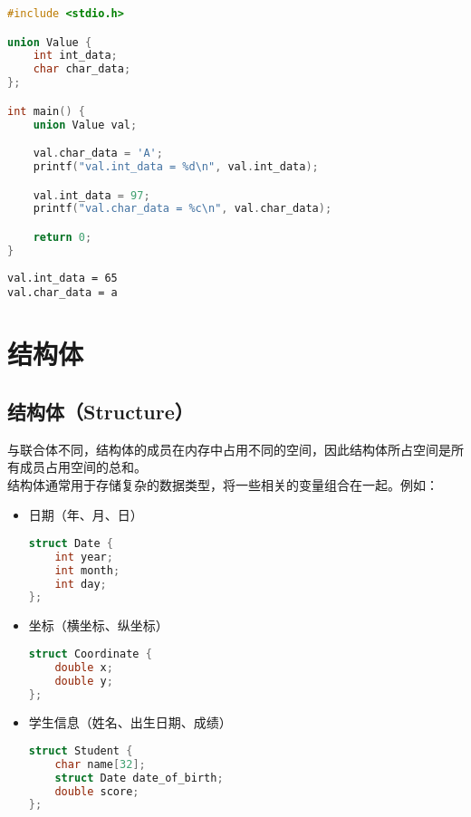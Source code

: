 
\begin{lstlisting}[language=C]
#include <stdio.h>

union Value {
    int int_data;
    char char_data;
};

int main() {
    union Value val;

    val.char_data = 'A';
    printf("val.int_data = %d\n", val.int_data);

    val.int_data = 97;
    printf("val.char_data = %c\n", val.char_data);

    return 0;
}
\end{lstlisting}

\begin{tcolorbox}
    \begin{verbatim}
val.int_data = 65
val.char_data = a
	\end{verbatim}
\end{tcolorbox}

\newpage

\section{结构体}

\subsection{结构体（Structure）}

与联合体不同，结构体的成员在内存中占用不同的空间，因此结构体所占空间是所有成员占用空间的总和。\\

结构体通常用于存储复杂的数据类型，将一些相关的变量组合在一起。例如：

\begin{itemize}
    \item 日期（年、月、日）
          \vspace{-0.5cm}
          \begin{lstlisting}[language=C]
struct Date {
    int year;
    int month;
    int day;
};
    \end{lstlisting}

    \item 坐标（横坐标、纵坐标）
          \vspace{-0.5cm}
          \begin{lstlisting}[language=C]
struct Coordinate {
    double x;
    double y;
};
    \end{lstlisting}

    \item 学生信息（姓名、出生日期、成绩）
          \vspace{-0.5cm}
          \begin{lstlisting}[language=C]
struct Student {
    char name[32];
    struct Date date_of_birth;
    double score;
};
    \end{lstlisting}
\end{itemize}

